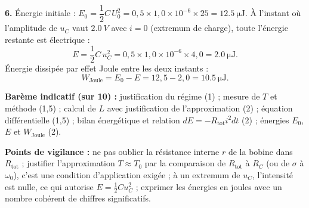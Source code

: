 \documentclass[11pt]{article}
\begin{document}
\begin{corrige}
\textbf{6.} Énergie initiale : $E_0 = \dfrac{1}{2}C\,U_0^2 = 0,5 \times 1,0\times10^{-6} \times 25 = \SI{12,5}{\micro\joule}$.
À l'instant où l'amplitude de $u_C$ vaut $\SI{2,0}{V}$ avec $i = 0$ (extremum de charge), toute l'énergie restante est électrique :
\[
E = \frac{1}{2}C\,u_C^2 = 0,5 \times 1,0\times10^{-6} \times 4,0 = \SI{2,0}{\micro\joule}.
\]
Énergie dissipée par effet Joule entre les deux instants :
\[
W_{\text{Joule}} = E_0 - E = 12,5 - 2,0 = \SI{10,5}{\micro\joule}.
\]

\textbf{Barème indicatif (sur 10) :} justification du régime (1) ; mesure de $T$ et méthode (1,5) ; calcul de $L$ avec justification de l'approximation (2) ; équation différentielle (1,5) ; bilan énergétique et relation $dE = -R_{\text{tot}}i^2 dt$ (2) ; énergies $E_0$, $E$ et $W_{\text{Joule}}$ (2).

\textbf{Points de vigilance :} ne pas oublier la résistance interne $r$ de la bobine dans $R_{\text{tot}}$ ; justifier l'approximation $T \approx T_0$ par la comparaison de $R_{\text{tot}}$ à $R_C$ (ou de $\sigma$ à $\omega_0$), c'est une condition d'application exigée ; à un extremum de $u_C$, l'intensité est nulle, ce qui autorise $E = \frac{1}{2}Cu_C^2$ ; exprimer les énergies en joules avec un nombre cohérent de chiffres significatifs.
\end{corrige}
\end{document}
